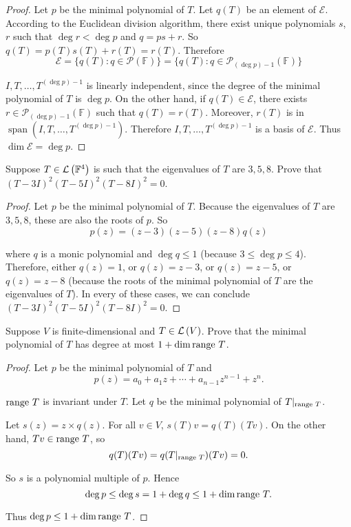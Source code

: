\begin{proof}
    Let $p$ be the minimal polynomial of $T$. Let $q(T)$ be an element of $\mathcal{E}$. According to the Euclidean division algorithm, there exist unique polynomials $s$, $r$ such that $\deg r < \deg p$ and $q = ps + r$. So $q(T) = p(T)s(T) + r(T) = r(T)$. Therefore
    \[
        \mathcal{E} = \{ q(T): q\in\mathscr{P}(\mathbb{F}) \} = \{ q(T): q\in\mathscr{P}_{(\deg p) - 1}(\mathbb{F}) \}
    \]

    $I, T, \ldots, T^{(\deg p) - 1}$ is linearly independent, since the degree of the minimal polynomial of $T$ is $\deg p$. On the other hand, if $q(T)\in \mathcal{E}$, there exists $r\in\mathscr{P}_{(\deg p) - 1}(\mathbb{F})$ such that $q(T) = r(T)$. Moreover, $r(T)$ is in $\operatorname{span}(I, T, \ldots, T^{(\deg p) - 1})$. Therefore $I, T, \ldots, T^{(\deg p) - 1}$ is a basis of $\mathcal{E}$. Thus $\dim \mathcal{E} = \deg p$.
\end{proof}
\newpage

\begin{exercise}
    Suppose $T \in \mathcal{L}\left({\mathbb{F}^{4}}\right)$ is such that the eigenvalues of $T$ are $3, 5, 8$. Prove that ${(T - 3I)}^{2}{(T - 5I)}^{2}{(T - 8I)}^{2} = 0$.
\end{exercise}

\begin{proof}
    Let $p$ be the minimal polynomial of $T$. Because the eigenvalues of $T$ are $3, 5, 8$, these are also the roots of $p$. So
    \[
        p(z) = (z - 3)(z - 5)(z - 8)q(z)
    \]

    where $q$ is a monic polynomial and $\deg q\leq 1$ (because $3\leq \deg p\leq 4$). Therefore, either $q(z) = 1$, or $q(z) = z - 3$, or $q(z) = z - 5$, or $q(z) = z - 8$ (because the roots of the minimal polynomial of $T$ are the eigenvalues of $T$). In every of these cases, we can conclude ${(T - 3I)}^{2}{(T - 5I)}^{2}{(T - 8I)}^{2} = 0$.
\end{proof}
\newpage

\begin{exercise}
    Suppose $V$ is finite-dimensional and $T \in \mathcal{L}\left({V}\right)$. Prove that the minimal
    polynomial of $T$ has degree at most $1 + \dim \operatorname{range}\,{T}$.
\end{exercise}

\begin{proof}
    Let $p$ be the minimal polynomial of $T$ and
    \[
        p(z) = a_{0} + a_{1}z + \cdots + a_{n-1}z^{n-1} + z^{n}.
    \]

    $\operatorname{range}\,{T}$ is invariant under $T$. Let $q$ be the minimal polynomial of $T\vert_{\operatorname{range}\,{T}}$.

    Let $s(z) = z\times q(z)$. For all $v\in V$, $s(T)v = q(T)(Tv)$. On the other hand, $Tv\in \operatorname{range}\,{T}$, so
    \[
        q(T)(Tv) = q(T\vert_{\operatorname{range}\,{T}})(Tv) = 0.
    \]

    So $s$ is a polynomial multiple of $p$. Hence
    \[
        \deg p \leq \deg s = 1 + \deg q \leq 1 + \dim\operatorname{range}\,{T}.
    \]

    Thus $\deg p\leq 1 + \dim\operatorname{range}\,{T}$.
\end{proof}
\newpage

